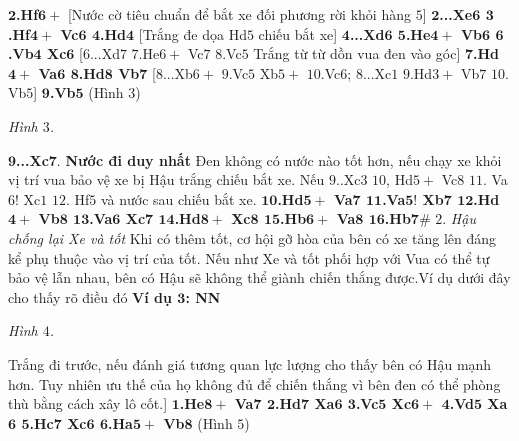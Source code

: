 \begin{multicols}{2}
	\vskip 0.1cm
	$\pmb{2}$\textbf{\color{gocco}.Hf}$\pmb{6+}$ [Nước cờ tiêu chuẩn để bắt xe đối phương rời khỏi hàng $5$]
	\vskip 0.1cm
	$\pmb{2}$\textbf{\color{gocco}...Xe$\pmb{6}$ $\pmb{3}$.Hf$\pmb{4+}$ Vc$\pmb{6}$ $\pmb{4}$.Hd}$\pmb{4}$ [Trắng đe dọa Hd$5$ chiếu bắt xe]
	\vskip 0.1cm
	$\pmb{4}$\textbf{\color{gocco}...Xd$\pmb{6}$ $\pmb{5}$.He$\pmb{4+}$ Vb$\pmb{6}$ $\pmb{6}$.Vb$\pmb{4}$ Xc}$\pmb{6}$ [$6$...Xd$7$ $7$.He$6+$ Vc$7$ $8$.Vc$5$ Trắng từ từ dồn vua đen vào góc]
	\vskip 0.1cm
	$\pmb{7}$\textbf{\color{gocco}.Hd$\pmb{4+}$ Va$\pmb{6}$ $\pmb{8}$.Hd$\pmb{8}$ Vb}$\pmb{7}$ [$8$...Xb$6+$ $9$.Vc$5$ Xb$5+$ $10$.Vc$6$; $8$...Xc$1$ $9$.Hd$3+$ Vb$7$ $10.$Vb$5$]
	\vskip 0.1cm
	$\pmb{9}$\textbf{\color{gocco}.Vb}$\pmb{5}$ (Hình $3$)
	\begin{center}
		\newgame
		\scalebox{0.85}\showboard
		\vskip 0.1cm
		\textit{\small\color{gocco}Hình $3$.}
	\end{center}
	$\pmb{9}$\textbf{\color{gocco}...Xc}$\pmb{7.}$ \textbf{\color{gocco}Nước đi duy nhất} Đen không có nước nào tốt hơn, nếu chạy xe khỏi vị trí vua bảo vệ xe bị Hậu trắng chiếu bắt xe. Nếu $9$..Xc$3$ $10$, Hd$5+$ Vc$8$ $11$. Va$6!$ Xc$1$ $12$. Hf$5$ và nước sau chiếu bắt xe.
	\vskip 0.1cm
	$\pmb{10}$\textbf{\color{gocco}.Hd$\pmb{5+}$ Va$\pmb{7}$ $\pmb{11}$.Va$\pmb{5!}$ Xb$\pmb{7}$ $\pmb{12}$.Hd$\pmb{4+}$ Vb$\pmb{8}$ $\pmb{13}$.Va$\pmb{6}$ Xc$\pmb{7}$ $\pmb{14}$.Hd$\pmb{8+}$ Xc$\pmb{8}$ $\pmb{15}$.Hb$\pmb{6+}$ Va$\pmb{8}$ $\pmb{16}$.Hb}$\pmb{7\#}$
	\vskip 0.1cm
	$2$. \textit{Hậu chống lại Xe và tốt}
	\vskip 0.1cm
	Khi có thêm tốt, cơ hội gỡ hòa của bên có xe tăng lên đáng kể phụ thuộc vào vị trí của tốt.
	\vskip 0.1cm
	Nếu như Xe và tốt phối hợp với Vua có thể tự bảo vệ lẫn nhau, bên có Hậu sẽ không thể giành chiến thắng được.Ví dụ dưới đây cho thấy rõ điều đó
	\vskip 0.1cm
	\textbf{\color{gocco}Ví dụ $\pmb{3}$: NN}
	\begin{center}
		\newgame
		\scalebox{0.85}\showboard
		\vskip 0.1cm
		\textit{\small\color{gocco}Hình $4$.}
		\vspace*{-5pt}
	\end{center}
	Trắng đi trước, nếu đánh giá tương quan lực lượng cho thấy bên có Hậu mạnh hơn. Tuy nhiên ưu thế của họ không đủ để chiến thắng vì bên đen có thể phòng thù bằng cách xây lô cốt.]
	\vskip 0.1cm
	$\pmb{1}$\textbf{\color{gocco}.He$\pmb{8+}$ Va$\pmb{7}$ $\pmb{2}$.Hd$\pmb{7}$ Xa$\pmb{6}$ $\pmb{3}$.Vc$\pmb{5}$ Xc$\pmb{6+}$ $\pmb{4}$.Vd$\pmb{5}$ Xa$\pmb{6}$ $\pmb{5}$.Hc$\pmb{7}$ Xc$\pmb{6}$ $\pmb{6}$.Ha$\pmb{5+}$ Vb}$\pmb{8}$ (Hình $5$)

\end{multicols}
